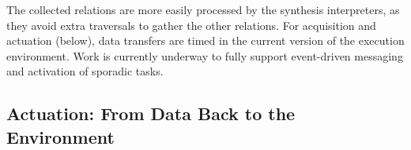 The collected relations are more easily processed by the synthesis interpreters,
as they avoid extra traversals to gather the other relations.  For acquisition 
and actuation (below), data transfers are timed in the current version of the 
execution environment.  Work is currently underway to fully support event-driven 
messaging and activation of sporadic tasks.

\subsection{Actuation: From Data Back to the Environment}

% 
